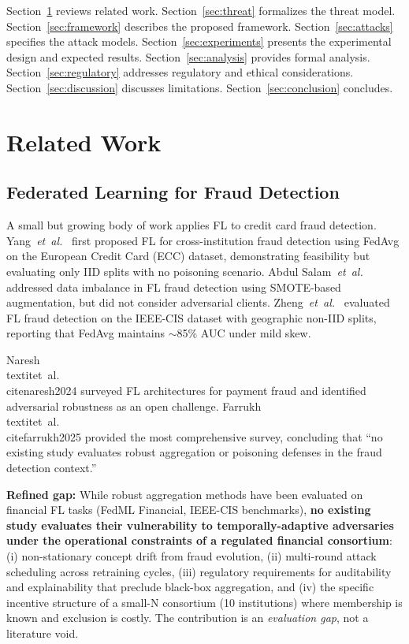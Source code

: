 \documentclass[10pt,journal]{IEEEtran}
\begin{document}
Section~\ref{sec:related} reviews related work. Section~\ref{sec:threat} formalizes the threat model. Section~\ref{sec:framework} describes the proposed framework. Section~\ref{sec:attacks} specifies the attack models. Section~\ref{sec:experiments} presents the experimental design and expected results. Section~\ref{sec:analysis} provides formal analysis. Section~\ref{sec:regulatory} addresses regulatory and ethical considerations. Section~\ref{sec:discussion} discusses limitations. Section~\ref{sec:conclusion} concludes.

\section{Related Work}
\label{sec:related}

\subsection{Federated Learning for Fraud Detection}

A small but growing body of work applies FL to credit card fraud detection. Yang~\textit{et~al.}~\cite{yang2019} first proposed FL for cross-institution fraud detection using FedAvg on the European Credit Card (ECC) dataset, demonstrating feasibility but evaluating only IID splits with no poisoning scenario. Abdul Salam~\textit{et~al.}~\cite{abdulsalam2024} addressed data imbalance in FL fraud detection using SMOTE-based augmentation, but did not consider adversarial clients. Zheng~\textit{et~al.}~\cite{zheng2025} evaluated FL fraud detection on the IEEE-CIS dataset with geographic non-IID splits, reporting that FedAvg maintains $\sim$85\% AUC under mild skew.

Naresh~\\textit{et~al.}~\\cite{naresh2024} surveyed FL architectures for payment fraud and identified adversarial robustness as an open challenge. Farrukh~\\textit{et~al.}~\\cite{farrukh2025} provided the most comprehensive survey, concluding that ``no existing study evaluates robust aggregation or poisoning defenses in the fraud detection context.''

\textbf{Refined gap:} While robust aggregation methods have been evaluated on financial FL tasks (FedML Financial, IEEE-CIS benchmarks), \textbf{no existing study evaluates their vulnerability to temporally-adaptive adversaries under the operational constraints of a regulated financial consortium}: (i) non-stationary concept drift from fraud evolution, (ii) multi-round attack scheduling across retraining cycles, (iii) regulatory requirements for auditability and explainability that preclude black-box aggregation, and (iv) the specific incentive structure of a small-N consortium (10 institutions) where membership is known and exclusion is costly. The contribution is an \emph{evaluation gap}, not a literature void.
\end{document}
